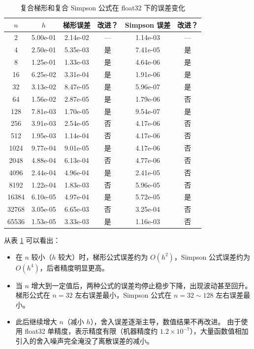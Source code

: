 \documentclass{article}
\begin{document}
\begin{table}[htbp]
\centering
\caption{复合梯形和复合 Simpson 公式在 float32 下的误差变化}
\label{tab:errors}
\begin{tabular}{c c c c c c}
\toprule
$n$ & $h$ & 梯形误差 & 改进？& Simpson 误差 & 改进？ \\
\midrule
2       & 5.00e-01 & 2.14e-02  & --- & 1.14e-03  & --- \\
4       & 2.50e-01 & 5.35e-03  & 是 & 7.41e-05  & 是 \\
8       & 1.25e-01 & 1.33e-03  & 是 & 4.64e-06  & 是 \\
16      & 6.25e-02 & 3.31e-04  & 是 & 1.91e-06  & 是 \\
32      & 3.13e-02 & 8.47e-05  & 是 & 5.96e-07  & 是 \\
64      & 1.56e-02 & 2.87e-05  & 是 & 1.79e-06  & 否 \\
128     & 7.81e-03 & 1.70e-05  & 是 & 9.54e-07  & 是 \\
256     & 3.91e-03 & 2.54e-05  & 否 & 4.17e-06  & 否 \\
512     & 1.95e-03 & 1.14e-04  & 否 & 4.17e-06  & 否 \\
1024    & 9.77e-04 & 9.01e-05  & 是 & 4.17e-06  & 否 \\
2048    & 4.88e-04 & 6.13e-04  & 否 & 4.77e-06  & 否 \\
4096    & 2.44e-04 & 4.96e-04  & 是 & 2.41e-05  & 否 \\
8192    & 1.22e-04 & 1.83e-03  & 否 & 5.96e-05  & 否 \\
16384   & 6.10e-05 & 4.97e-04  & 是 & 5.72e-05  & 是 \\
32768   & 3.05e-05 & 6.65e-03  & 否 & 3.25e-04  & 否 \\
65536   & 1.53e-05 & 3.33e-03  & 是 & 1.16e-03  & 否 \\
\bottomrule
\end{tabular}
\end{table}

从表 \ref{tab:errors} 可以看出：
\begin{itemize}
    \item 在 $n$ 较小（$h$ 较大）时，梯形公式误差约为 $O(h^2)$，Simpson 公式误差约为 $O(h^4)$，后者精度明显更高。
    \item 当 $n$ 增大到一定值后，两种公式的误差均停止稳步下降，出现波动甚至回升。 梯形公式在 $n=32$ 左右误差最小，Simpson 公式在 $n=32\sim 128$ 左右误差最小。
    \item 此后继续增大 $n$（减小 $h$），舍入误差逐渐主导，数值结果不再改进。 由于使用 float32 单精度，表示精度有限（机器精度约 $1.2\times10^{-7}$），大量函数值相加引入的舍入噪声完全淹没了离散误差的减小。
\end{itemize}
\end{document}

